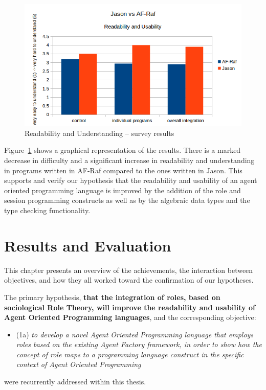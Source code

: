 \documentclass[a4paper,12pt,oneside,fleqn]{book} %
\begin{document}
\begin{figure}\footnotesize %
\includegraphics{jasonvsafraf.png}
\caption{Readability and Understanding -- survey results}
\label{fig:Survey}
\end{figure} %

Figure~\ref{fig:Survey} shows a graphical representation of the results.
There is a marked decrease in difficulty and a significant increase in
readability and understanding in programs written in AF-Raf compared to the
ones written in Jason. This supports and verify our hypothesis that the
readability and usability of an agent oriented programming language is
improved by the addition of the role and session programming constructs as
well as by the algebraic data types and the type checking functionality.

\chapter{Results and Evaluation}\label{ch:results} %

This chapter presents an overview of the achievements, the interaction
between objectives, and how they all worked toward the confirmation of our
hypotheses. 

The primary hypothesis, \textbf{that the integration of roles, based on
sociological Role Theory, will improve the readability and usability of
Agent Oriented Programming languages}, and the corresponding objective:

\begin{itemize}
  \item (1a) \textit{to develop a novel Agent Oriented Programming language that employs roles based on the existing Agent Factory framework, in order to show how the concept of role maps to a programming language construct in the specific context of Agent Oriented Programming} 
\end{itemize}
were recurrently addressed within this thesis. 
\end{document}
